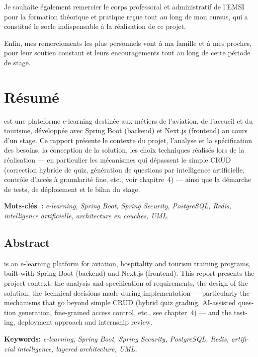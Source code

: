 \documentclass[12pt,a4paper,oneside]{report}
\begin{document}
Je souhaite également remercier le corps professoral et administratif de
l'EMSI pour la formation théorique et pratique reçue tout au long de mon
cursus, qui a constitué le socle indispensable à la réalisation de ce
projet.

Enfin, mes remerciements les plus personnels vont à ma famille et à mes
proches, pour leur soutien constant et leurs encouragements tout au long de
cette période de stage.

\clearpage
\chapter*{Résumé}

\Entreprise{} est une plateforme e-learning destinée aux métiers de
l'aviation, de l'accueil et du tourisme, développée avec Spring Boot
(backend) et Next.js (frontend) au cours d'un stage. Ce rapport
présente le contexte du
projet, l'analyse et la spécification des besoins, la conception de la
solution, les choix techniques réalisés lors de la réalisation --- en
particulier les mécanismes qui dépassent le simple CRUD (correction hybride
de quiz, génération de questions par intelligence artificielle, contrôle
d'accès à granularité fine, etc., voir chapitre~4) --- ainsi que la
démarche de tests, de déploiement et le bilan du stage.

\vspace{0.5cm}
\noindent\textbf{Mots-clés~:} \textit{e-learning, Spring Boot, Spring
Security, PostgreSQL, Redis, intelligence artificielle, architecture en
couches, UML.}

\vspace{1.5cm}
\begin{otherlanguage}{english}
\section*{Abstract}
\Entreprise{} is an e-learning platform for aviation, hospitality and
tourism training programs, built with Spring Boot (backend) and Next.js
(frontend). This report presents the project context, the analysis and
specification of requirements, the design of the solution, the technical
decisions made during implementation --- particularly the mechanisms that
go beyond simple CRUD (hybrid quiz grading, AI-assisted question
generation, fine-grained access control, etc., see chapter~4) --- and the
testing, deployment approach and internship review.

\vspace{0.5cm}
\noindent\textbf{Keywords:} \textit{e-learning, Spring Boot, Spring
Security, PostgreSQL, Redis, artificial intelligence, layered
architecture, UML.}
\end{otherlanguage}
\end{document}
